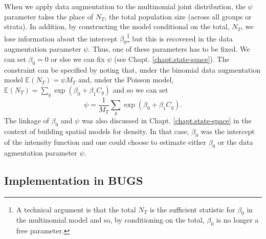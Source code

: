 When we apply data augmentation to the multinomial joint distribution,
the $\psi$ parameter takes the place of $N_{T}$, the total population
size (across all groups or strata). In addition, by constructing the
model conditional on the total, $N_{T}$, we lose information about the
intercept $\beta_{0}$\footnote{ A technical argument is that the total
  $N_{T}$ is the sufficient statistic for $\beta_{0}$ in the
  multinomial model and so, by conditioning on the total, $\beta_{0}$
  is no longer a free parameter.}  but this is recovered in the data
augmentation parameter $\psi$.  Thus, one of these parameters has to
be fixed. We can set $\beta_0 = 0$ or else we can fix $\psi$ (see
Chapt. \ref{chapt.state-space}).  The constraint can be specified by
noting that, under the binomial data augmentation model
$\mathbb{E}(N_{T}) = \psi M_{T}$ and, under the Poisson model,
$\mathbb{E}(N_{T}) = \sum_{g} \exp(\beta_{0} + \beta_{1} C_{g})$ and
so we can set
\[
 \psi = \frac{1}{M_{T}} \sum_{g} \exp(\beta_{0} + \beta_{1} C_{g}).
\]
The linkage of $\beta_{0}$ and $\psi$ was also discussed in
Chapt. \ref{chapt.state-space} in the context of building spatial
models for density. In that case, $\beta_0$ was the intercept of the
intensity function and one could choose to estimate either $\beta_0$
or the data agmentation parameter $\psi$.

\subsection{Implementation in BUGS}

